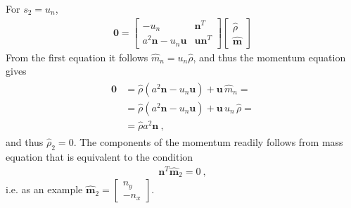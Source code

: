 \documentclass[letterpaper,10pt,english]{jupyterBook}
\begin{document}
\sphinxAtStartPar
For \(s_{2} = u_n\),
\begin{equation*}
\begin{split}
\mathbf{0} = \begin{bmatrix} -u_n & \mathbf{n}^T \\ a^2 \mathbf{n} - u_n \mathbf{u} & \mathbf{u} \mathbf{n}^T \end{bmatrix}
\begin{bmatrix} \hat{\rho} \\ \hat{\mathbf{m}} \end{bmatrix}
\end{split}
\end{equation*}
\sphinxAtStartPar
From the first equation it follows \(\hat{m}_n = u_n \hat{\rho}\), and thus the momentum equation gives
\begin{equation*}
\begin{split}\begin{aligned}
  \mathbf{0}
  & = \hat{\rho} ( a^2 \mathbf{n} - u_n \mathbf{u} ) + \mathbf{u} \, \hat{m}_n = \\
  & = \hat{\rho} ( a^2 \mathbf{n} - u_n \mathbf{u} ) + \mathbf{u} \, u_n \, \hat{\rho} = \\
  & = \hat{\rho}   a^2 \mathbf{n} \ ,
\end{aligned}\end{split}
\end{equation*}
\sphinxAtStartPar
and thus \(\hat{\rho}_2 = 0\). The components of the momentum readily follows from mass equation that is equivalent to the condition
\begin{equation*}
\begin{split}\mathbf{n}^T \hat{\mathbf{m}}_{2} = 0 \ ,\end{split}
\end{equation*}
\sphinxAtStartPar
i.e. as an example \(\hat{\mathbf{m}}_{2} = \begin{bmatrix} n_y \\ -n_x \end{bmatrix}\).
\end{document}
